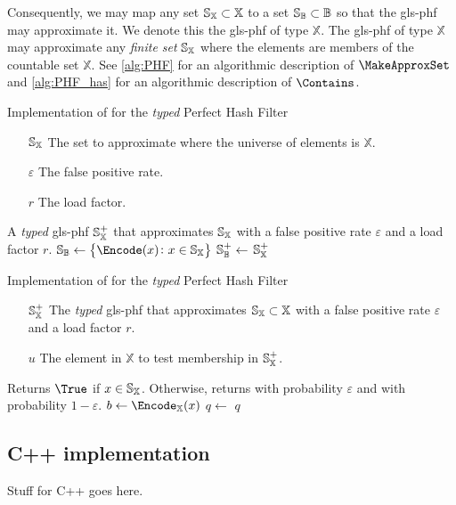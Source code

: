 \documentclass[ ../main.tex]{subfiles}
\begin{document}
Consequently, we may map any set $\mathbb{S}_\mathbb{X} \subset \mathbb{X}$ to a set $\mathbb{S}_{\mathbb{B}} \subset \mathbb{B}$ so that the \gls{gls-phf} may approximate it. We denote this the \gls{gls-phf} of type $\mathbb{X}$. The \gls{gls-phf} of type $\mathbb{X}$ may approximate any \emph{finite set} $\mathbb{S}_\mathbb{X}$ where the elements are members of the countable set $\mathbb{X}$. See \cref{alg:PHF} for an algorithmic description of $\MakeApproxSet$ and \cref{alg:PHF_has} for an algorithmic description of $\Contains$.
\begin{algorithm}[h]
    \caption{Implementation of \protect\MakeApproxSet for the \emph{typed} Perfect Hash Filter}
    \label{alg:typedPHF}
    \KwIn
    {
        \begin{itemize}
            \item[$\mathbb{S}_{\mathbb{X}}$] The set to approximate where the universe of elements is $\mathbb{X}$.
            \item[$\varepsilon$] The false positive rate.
            \item[$r$] The load factor.
        \end{itemize}
    }
    \KwOut
    {
        A \emph{typed} \gls{gls-phf} $\mathbb{S}^+_{\mathbb{X}}$ that approximates $\mathbb{S}_{\mathbb{X}}$ with a false positive rate $\varepsilon$ and a load factor $r$.
    }
    {
        $\St_\cisb \gets \left\{ \Encode(x) \colon x \in \St_{\mathbb{X}}\right\}$\;
        $\mathbb{S}^+_{\mathbb{B}} \gets$ \;
        \Return $\mathbb{S}^+_{\mathbb{X}}$\;
    }
\end{algorithm}
\begin{algorithm}[h]
    \caption{Implementation of \protect\Contains for the \emph{typed} Perfect Hash Filter}
    \label{alg:typed_PHF_contains}
    \KwIn
    {
        \begin{itemize}
            \item[$\mathbb{S}^+_{\mathbb{X}}$] The \emph{typed} \gls{gls-phf} that approximates $\mathbb{S}_{\mathbb{X}} \subset \mathbb{X}$ with a false positive rate $\varepsilon$ and a load factor $r$.
            \item[$u$] The element in $\mathbb{X}$ to test membership in $\mathbb{S}^+_{\mathbb{X}}$.
        \end{itemize}
    }
    \KwOut
    {
        Returns $\True$ if $x \in \mathbb{S}_{\mathbb{X}}$. Otherwise, returns \True with probability $\varepsilon$ and \False with probability $1 - \varepsilon$.
    }
    {
        $b \gets \Encode_\mathbb{X}(x)$\;
        $q \gets$ \;
        \Return $q$\;
    }
\end{algorithm}

\subsection{C++ implementation}
Stuff for C++ goes here.
\end{document}
